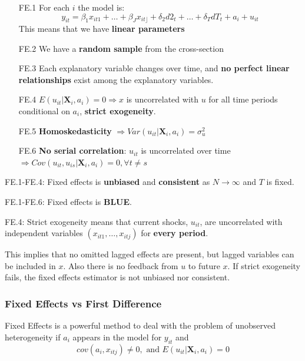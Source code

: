 \documentclass[11pt]{article}
\begin{document}
\begin{itemize}
    \item [FE.1] For each $i$ the model is:
    \begin{equation}
y_{i t}=\beta_1 x_{i t 1}+\ldots+\beta_J x_{i t\rfloor}+\delta_2 d 2_t+\ldots+\delta_T d T_t+a_i+u_{i t}
\end{equation}
This means that we have \textbf{linear parameters}
\item [FE.2] We have a \textbf{random sample} from the cross-section
\item [FE.3] Each explanatory variable changes over time, and \textbf{no perfect linear relationships} exist among the explanatory variables.
\item [FE.4] $E(u_{it}|\boldsymbol{X}_i, a_i) = 0 \Rightarrow x$ is uncorrelated with $u$ for all time periods conditional on $a_i$, \textbf{strict exogeneity}. 
\item[FE.5] \textbf{Homoskedasticity} $\Rightarrow Var(u_{it}|\boldsymbol{X}_i,a_i) = \sigma_u^2$
\item [FE.6] \textbf{No serial correlation}: $u_{it}$ is uncorrelated over time $\Rightarrow Cov(u_{it},u_{is}|\boldsymbol{X}_i, a_i) = 0, \forall t\neq s$
\end{itemize}


\begin{note}
    FE.1-FE.4: Fixed effects is \textbf{unbiased} and \textbf{consistent} as $N \rightarrow \infty$ and $T$ is fixed.

    FE.1-FE.6: Fixed effects is \textbf{BLUE}.
\end{note}

FE.4: Strict exogeneity means that current shocks, $u_{it}$, are uncorrelated with independent variables $(x_{it1},\ldots, x_{itj})$ for \textbf{every period}.

This implies that no omitted lagged effects are present, but lagged variables can be included in $x$. Also there is no feedback from $u$ to future $x$. If strict exogeneity fails, the fixed effects estimator is not unbiased nor consistent.

\subsubsection{Fixed Effects vs First Difference}

Fixed Effects is a powerful method to deal with the problem of unobserved heterogeneity if $a_i$ appears in the model for $y_{it}$ and
\[cov(a_{i},x_{itj}) \neq 0, \text{ and } E(u_{it}|\boldsymbol{X}_i,a_i)=0\]
\end{document}
